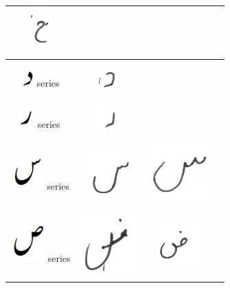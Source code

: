 \documentclass[a4paper,conference]{IEEEtran}
\begin{document}
\begin{table}[h]
\begin{tabular}{@{}cccc@{}}
\includegraphics[scale=0.15]{188}  \\
\hline
\includegraphics[scale=0.25]{daal_orig} series & \includegraphics[scale=0.15]{189} & &  \\
\hline
\includegraphics[scale=0.25]{re_orig} series & \includegraphics[scale=0.15]{190} &  &  \\
\hline
\includegraphics[scale=0.25]{seen_orig} series & \includegraphics[scale=0.15]{191} & 
\includegraphics[scale=0.15]{192} &  \\
\hline
\includegraphics[scale=0.20]{suad_orig} series & \includegraphics[scale=0.15]{193} & \includegraphics[scale=0.15]{194} &  \\

\end{tabular}
\end{table}
\end{document}
